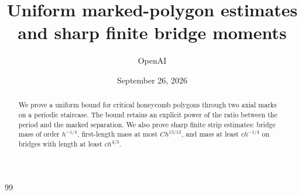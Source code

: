 \documentclass[11pt]{article}
\title{Uniform marked-polygon estimates and sharp finite bridge moments}
\author{OpenAI}
\date{September 26, 2026}
\numberwithin{equation}{section}
\theoremstyle{definition}
\theoremstyle{remark}
\begin{document}
\maketitle
\begin{abstract}
We prove a uniform bound for critical honeycomb polygons through two axial marks on a periodic staircase. The bound retains an explicit power of the ratio between the period and the marked separation. We also prove sharp finite strip estimates: bridge mass of order $h^{-1/4}$, first-length mass at most $Ch^{13/12}$, and mass at least $ch^{-1/4}$ on bridges with length at least $ch^{4/3}$.
\end{abstract}
\tableofcontents










\begin{thebibliography}{99}
\raggedright

\end{thebibliography}
\end{document}
